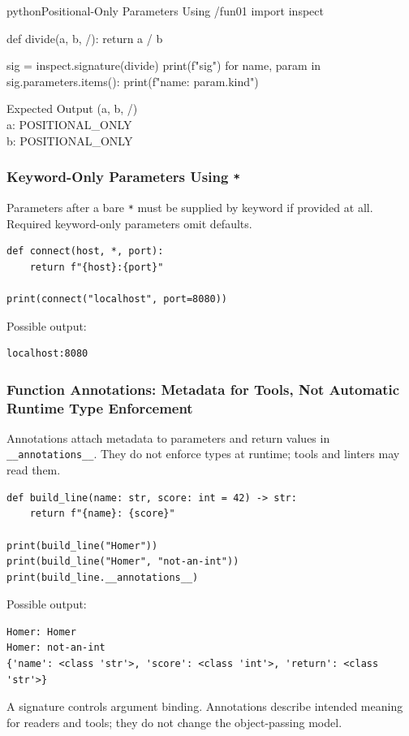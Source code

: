 \begin{codebox}[]{python}{Positional-Only Parameters Using /}{fun01}
import inspect

def divide(a, b, /):
    return a / b

sig = inspect.signature(divide)
print(f"{sig}")
for name, param in sig.parameters.items():
    print(f"{name}: {param.kind}")
\end{codebox}


\begin{iobox}{Expected Output}
(a, b, /) \\
a: POSITIONAL\_ONLY \\
b: POSITIONAL\_ONLY \\
\end{iobox}




\subsubsection{Keyword-Only Parameters Using \texttt{*}}

Parameters after a bare \texttt{*} must be supplied by keyword if provided at all. Required keyword-only parameters omit defaults.

\begin{verbatim}
def connect(host, *, port):
    return f"{host}:{port}"

print(connect("localhost", port=8080))
\end{verbatim}

Possible output:

\begin{verbatim}
localhost:8080
\end{verbatim}

\subsubsection{Function Annotations: Metadata for Tools, Not Automatic Runtime Type Enforcement}

Annotations attach metadata to parameters and return values in \texttt{\_\_annotations\_\_}. They do not enforce types at runtime; tools and linters may read them.

\begin{verbatim}
def build_line(name: str, score: int = 42) -> str:
    return f"{name}: {score}"

print(build_line("Homer"))
print(build_line("Homer", "not-an-int"))
print(build_line.__annotations__)
\end{verbatim}

Possible output:

\begin{verbatim}
Homer: Homer
Homer: not-an-int
{'name': <class 'str'>, 'score': <class 'int'>, 'return': <class 'str'>}
\end{verbatim}

A signature controls argument binding. Annotations describe intended meaning for readers and tools; they do not change the object-passing model.
